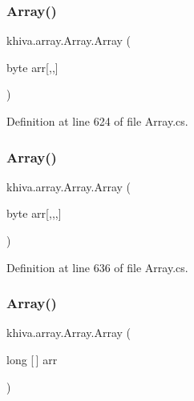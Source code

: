 \subsubsection{\texorpdfstring{Array()}{Array()}\hspace{0.1cm}{\footnotesize\ttfamily [27/46]}}
{\footnotesize\ttfamily khiva.\+array.\+Array.\+Array (\begin{DoxyParamCaption}\item[{byte}]{arr\mbox{[},,\mbox{]} }\end{DoxyParamCaption})\hspace{0.3cm}{\ttfamily [inline]}}



Definition at line 624 of file Array.\+cs.

\mbox{\label{classkhiva_1_1array_1_1_array_a6446cd7717b9d0a75c0a6ec86db88f87}} 
\subsubsection{\texorpdfstring{Array()}{Array()}\hspace{0.1cm}{\footnotesize\ttfamily [28/46]}}
{\footnotesize\ttfamily khiva.\+array.\+Array.\+Array (\begin{DoxyParamCaption}\item[{byte}]{arr\mbox{[},,,\mbox{]} }\end{DoxyParamCaption})\hspace{0.3cm}{\ttfamily [inline]}}



Definition at line 636 of file Array.\+cs.

\mbox{\label{classkhiva_1_1array_1_1_array_ac9eeae816240ba0103441b4469c10fac}} 
\subsubsection{\texorpdfstring{Array()}{Array()}\hspace{0.1cm}{\footnotesize\ttfamily [29/46]}}
{\footnotesize\ttfamily khiva.\+array.\+Array.\+Array (\begin{DoxyParamCaption}\item[{long \mbox{[}$\,$\mbox{]}}]{arr }\end{DoxyParamCaption})\hspace{0.3cm}{\ttfamily [inline]}}



